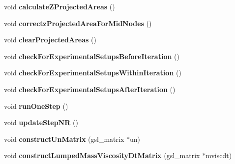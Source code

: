 \begin{DoxyCompactItemize}
\item 
\hypertarget{classSimulation_af21c5c157e6f487f879bdd7043288982}{}void {\bfseries calculate\+Z\+Projected\+Areas} ()\label{classSimulation_af21c5c157e6f487f879bdd7043288982}

\item 
\hypertarget{classSimulation_a7a47dfca0623a5636cb65416411cb901}{}void {\bfseries correctz\+Projected\+Area\+For\+Mid\+Nodes} ()\label{classSimulation_a7a47dfca0623a5636cb65416411cb901}

\item 
\hypertarget{classSimulation_a9c3f5acaa8ec130dedc94dfd6f7b013a}{}void {\bfseries clear\+Projected\+Areas} ()\label{classSimulation_a9c3f5acaa8ec130dedc94dfd6f7b013a}

\item 
\hypertarget{classSimulation_aa9ad0627365ad5d465b273183c7db344}{}void {\bfseries check\+For\+Experimental\+Setups\+Before\+Iteration} ()\label{classSimulation_aa9ad0627365ad5d465b273183c7db344}

\item 
\hypertarget{classSimulation_a2ebd37d36e25d118738d25811da4aa45}{}void {\bfseries check\+For\+Experimental\+Setups\+Within\+Iteration} ()\label{classSimulation_a2ebd37d36e25d118738d25811da4aa45}

\item 
\hypertarget{classSimulation_ae8b5dcc56bb2633d284a413f1e9dc1e9}{}void {\bfseries check\+For\+Experimental\+Setups\+After\+Iteration} ()\label{classSimulation_ae8b5dcc56bb2633d284a413f1e9dc1e9}

\item 
\hypertarget{classSimulation_a87606f3d0520a91cc0af6d05428546ab}{}void {\bfseries run\+One\+Step} ()\label{classSimulation_a87606f3d0520a91cc0af6d05428546ab}

\item 
\hypertarget{classSimulation_a6a869cb433953d1d36249460b0a74545}{}void {\bfseries update\+Step\+N\+R} ()\label{classSimulation_a6a869cb433953d1d36249460b0a74545}

\item 
\hypertarget{classSimulation_ac4afa7d6aa64384e78401aec62dd2270}{}void {\bfseries construct\+Un\+Matrix} (gsl\+\_\+matrix $\ast$un)\label{classSimulation_ac4afa7d6aa64384e78401aec62dd2270}

\item 
\hypertarget{classSimulation_a3a32fcfa18ce4343dface42f0800b35c}{}void {\bfseries construct\+Lumped\+Mass\+Viscosity\+Dt\+Matrix} (gsl\+\_\+matrix $\ast$mviscdt)\label{classSimulation_a3a32fcfa18ce4343dface42f0800b35c}


\end{DoxyCompactItemize}
